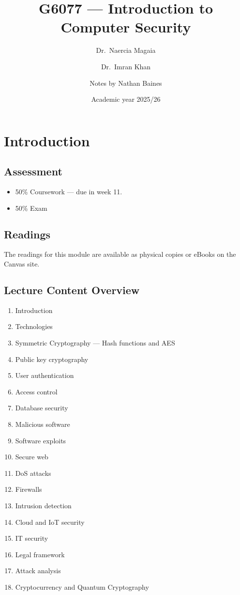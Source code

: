 \documentclass[a4paper]{article}
\title{G6077 --- Introduction to Computer Security}
\author{Dr.\ Naercia Magaia \and Dr.\ Imran Khan \and Notes by Nathan Baines}
\date{Academic year 2025/26}
\begin{document}
\maketitle

\section{Introduction}
\subsection{Assessment}
\begin{itemize}
    \item 50\% Coursework --- due in week 11.
    \item 50\% Exam
\end{itemize}

\subsection{Readings}
The readings for this module are available as physical copies or eBooks on the Canvas site.

\subsection{Lecture Content Overview}
\begin{enumerate}
	\item Introduction
	\item Technologies
	\item Symmetric Cryptography --- Hash functions and AES
	\item Public key cryptography
	\item User authentication
	\item Access control
	\item Database security
	\item Malicious software
	\item Software exploits
	\item Secure web
	\item DoS attacks
	\item Firewalls
	\item Intrusion detection
	\item Cloud and IoT security
	\item IT security
	\item Legal framework
	\item Attack analysis
	\item Cryptocurrency and Quantum Cryptography
\end{enumerate}
\end{document}
